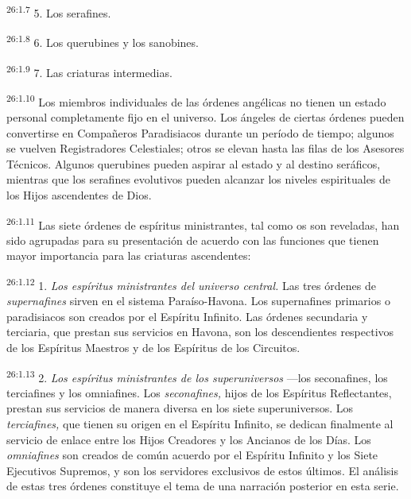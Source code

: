 \par
\textsuperscript{26:1.7} 5. Los serafines.

\par
\textsuperscript{26:1.8} 6. Los querubines y los sanobines.

\par
\textsuperscript{26:1.9} 7. Las criaturas intermedias.

\par
\textsuperscript{26:1.10} Los miembros individuales de las órdenes angélicas no tienen un estado personal completamente fijo en el universo. Los ángeles de ciertas órdenes pueden convertirse en Compañeros Paradisiacos durante un período de tiempo; algunos se vuelven Registradores Celestiales; otros se elevan hasta las filas de los Asesores Técnicos. Algunos querubines pueden aspirar al estado y al destino seráficos, mientras que los serafines evolutivos pueden alcanzar los niveles espirituales de los Hijos ascendentes de Dios.

\par
\textsuperscript{26:1.11} Las siete órdenes de espíritus ministrantes, tal como os son reveladas, han sido agrupadas para su presentación de acuerdo con las funciones que tienen mayor importancia para las criaturas ascendentes:

\par
\textsuperscript{26:1.12} 1. \textit{Los espíritus ministrantes del universo central.} Las tres órdenes de \textit{supernafines} sirven en el sistema Paraíso-Havona. Los supernafines primarios o paradisiacos son creados por el Espíritu Infinito. Las órdenes secundaria y terciaria, que prestan sus servicios en Havona, son los descendientes respectivos de los Espíritus Maestros y de los Espíritus de los Circuitos.

\par
\textsuperscript{26:1.13} 2. \textit{Los espíritus ministrantes de los superuniversos} ---los seconafines, los terciafines y los omniafines. Los \textit{seconafines,} hijos de los Espíritus Reflectantes, prestan sus servicios de manera diversa en los siete superuniversos. Los \textit{terciafines,} que tienen su origen en el Espíritu Infinito, se dedican finalmente al servicio de enlace entre los Hijos Creadores y los Ancianos de los Días. Los \textit{omniafines} son creados de común acuerdo por el Espíritu Infinito y los Siete Ejecutivos Supremos, y son los servidores exclusivos de estos últimos. El análisis de estas tres órdenes constituye el tema de una narración posterior en esta serie.

